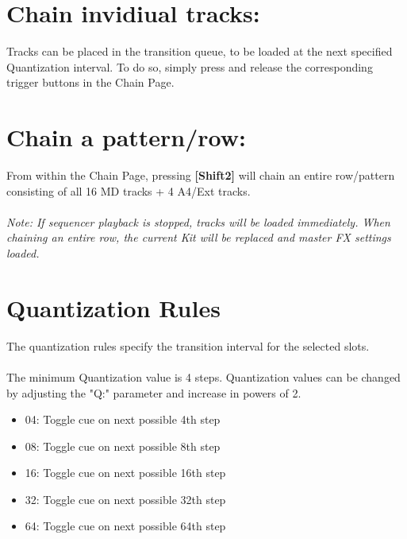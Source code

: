 \section{Chain invidiual tracks:}
Tracks can be placed in the transition queue, to be loaded at the next specified Quantization interval. To do so, simply press and release the corresponding trigger buttons in the Chain Page.
\section{Chain a pattern/row:}
From within the Chain Page, pressing \textbf{[Shift2]} will chain an entire row/pattern consisting of all 16 MD tracks + 4 A4/Ext tracks.\\
\\
\textit{Note: If sequencer playback is stopped, tracks will be loaded immediately. When chaining an entire row, the current Kit will be replaced and master FX settings loaded.}
\newpage
\section{Quantization Rules}
The quantization rules specify the transition interval for the selected slots.\\
\\
The minimum Quantization value is 4 steps. Quantization values can be changed by adjusting the "Q:" parameter and increase in powers of 2.\\
\begin{itemize}
\item 04: Toggle cue on next possible 4th step
\item 08: Toggle cue on next possible 8th step 
\item 16: Toggle cue on next possible 16th step 
\item 32: Toggle cue on next possible 32th step 
\item 64: Toggle cue on next possible 64th step
\end{itemize}

